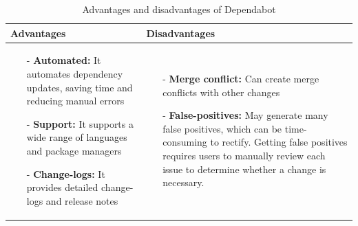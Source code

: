 \begin{table}[H]
\centering
\begin{tabular}{|>{\raggedright\arraybackslash}p{6cm}|>{\raggedright\arraybackslash}p{6cm}|}
\hline
\textbf{Advantages} & \textbf{Disadvantages} \\
\hline
\begin{itemize}
\item [-]\textbf{Automated:} It automates dependency updates, saving time and reducing manual errors 
\vspace{5pt}
\item [-] \textbf{Support:} It supports a wide range of languages and package managers 
\vspace{5pt}
\item [-]\textbf{Change-logs:} It provides detailed change-logs and release notes 
\end{itemize}
&
\begin{itemize}
\item [-] \textbf{Merge conflict:} Can create merge conflicts with other changes
\vspace{5pt}
\item [-] \textbf{False-positives:} May generate many false positives, which can be time-consuming to rectify. Getting false positives requires users to manually review each issue to determine whether a change is necessary. 

\end{itemize}
\\
\hline
\end{tabular}
\caption{Advantages and disadvantages of Dependabot}
\label{tab:dependabot}
\end{table}


